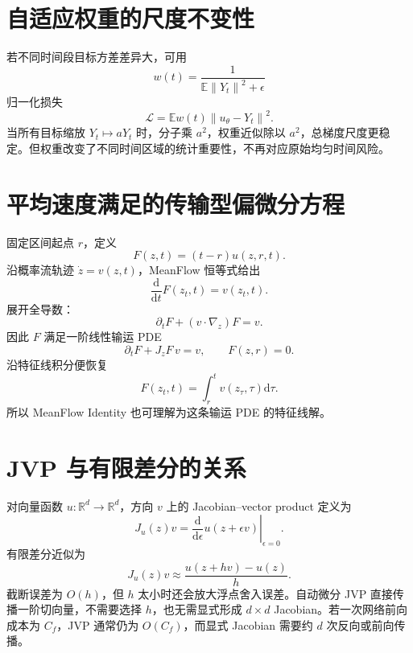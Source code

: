 \documentclass[UTF8,12pt,a4paper,fontset=none]{ctexart}
\numberwithin{equation}{section}
\newcommand{\R}{\mathbb{R}}
\newcommand{\E}{\mathbb{E}}
\newcommand{\Loss}{\mathcal{L}}
\newcommand{\norm}[1]{\left\lVert #1\right\rVert}
\newcommand{\dd}{\mathrm{d}}
\begin{document}
\section{自适应权重的尺度不变性}
若不同时间段目标方差差异大，可用
\begin{equation}
 w(t)=\frac1{\E\norm{Y_t}^2+\epsilon}
\end{equation}
归一化损失
\begin{equation}
 \Loss=\E w(t)\norm{u_\theta-Y_t}^2.
\end{equation}
当所有目标缩放 $Y_t\mapsto aY_t$ 时，分子乘 $a^2$，权重近似除以 $a^2$，总梯度尺度更稳定。但权重改变了不同时间区域的统计重要性，不再对应原始均匀时间风险。
\clearpage
\section{平均速度满足的传输型偏微分方程}
固定区间起点 $r$，定义
\begin{equation}
 F(z,t)=(t-r)u(z,r,t).
\end{equation}
沿概率流轨迹 $\dot z=v(z,t)$，MeanFlow 恒等式给出
\begin{equation}
 \frac{\dd}{\dd t}F(z_t,t)=v(z_t,t).
\end{equation}
展开全导数：
\begin{equation}
 \partial_tF+(v\cdot\nabla_z)F=v.
\end{equation}
因此 $F$ 满足一阶线性输运 PDE
\begin{equation}
 \boxed{\partial_tF+J_zF\,v=v,\qquad F(z,r)=0.}
\end{equation}
沿特征线积分便恢复
\begin{equation}
 F(z_t,t)=\int_r^t v(z_\tau,\tau)\dd\tau.
\end{equation}
所以 MeanFlow Identity 也可理解为这条输运 PDE 的特征线解。

\section{JVP 与有限差分的关系}
对向量函数 $u:\R^d\to\R^d$，方向 $v$ 上的 Jacobian--vector product 定义为
\begin{equation}
 J_u(z)v=\left.\frac{\dd}{\dd\epsilon}u(z+\epsilon v)\right|_{\epsilon=0}.
\end{equation}
有限差分近似为
\begin{equation}
 J_u(z)v\approx\frac{u(z+h v)-u(z)}{h}.
\end{equation}
截断误差为 $O(h)$，但 $h$ 太小时还会放大浮点舍入误差。自动微分 JVP 直接传播一阶切向量，不需要选择 $h$，也无需显式形成 $d\times d$ Jacobian。若一次网络前向成本为 $C_f$，JVP 通常仍为 $O(C_f)$，而显式 Jacobian 需要约 $d$ 次反向或前向传播。
\end{document}
